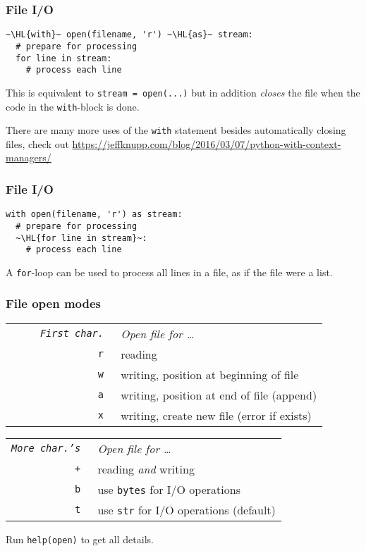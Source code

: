 \documentclass[english,serif,mathserif,xcolor=pdftex,dvipsnames,table]{beamer}
\begin{document}
\begin{frame}[fragile]
  \frametitle{File I/O}

\begin{lstlisting}
~\HL{with}~ open(filename, 'r') ~\HL{as}~ stream:
  # prepare for processing
  for line in stream:
    # process each line
\end{lstlisting}

  \+
  This is equivalent to \lstinline|stream = open(...)| but in addition
  \emph{closes} the file when the code in the \texttt{with}-block is done.

  \+
  There are many more uses of the \texttt{with} statement besides automatically
  closing files, check out \url{https://jeffknupp.com/blog/2016/03/07/python-with-context-managers/}
\end{frame}


\begin{frame}[fragile]
  \frametitle{File I/O}

\begin{lstlisting}
with open(filename, 'r') as stream:
  # prepare for processing
  ~\HL{for line in stream}~:
    # process each line
\end{lstlisting}

  \+ A \texttt{for}-loop can be used to process all lines in a file, as if the
  file were a list.
\end{frame}


\begin{frame}
  \frametitle{File open modes}
  \begin{center}
    \begin{tabular}{>{\tt}rl}
      {\rm\em ~~~~~First char.}
      & {\rm\em Open file for \ldots}
      \\
      \texttt{r}
      & reading
      \\
      \texttt{w}
      & writing, position at beginning of file
      \\
      \texttt{a}
      & writing, position at end of file (append)
      \\
      \texttt{x}
      & writing, create new file (error if exists)
      \\
    \end{tabular}

    \+
    \begin{tabular}{>{\tt}rl}
      {\rm\em More char.'s}
      & {\rm\em Open file for \ldots}
      \\
      \texttt{+}
      & reading \emph{and} writing
      \\
      \texttt{b}
      & use \texttt{bytes} for I/O operations
      \\
      \texttt{t}
      & use \texttt{str} for I/O operations (default)
      \\
    \end{tabular}

    \+ Run \texttt{help(open)} to get all details.
  \end{center}
\end{frame}
\end{document}
